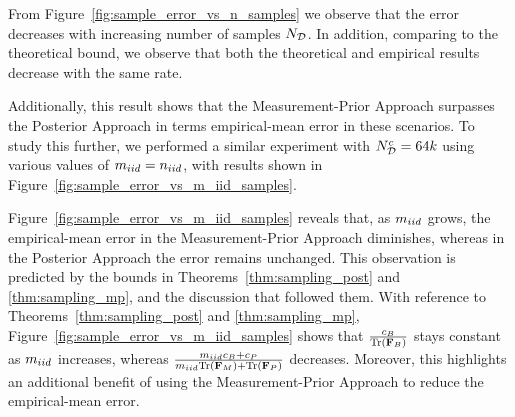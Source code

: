 From Figure~\ref{fig:sample_error_vs_n_samples} we observe that the error decreases with increasing number of samples $N_{\mathcal{D}}$. In addition, comparing to the theoretical bound, %
we observe that both the theoretical and empirical results decrease with the same rate. %
{Additionally, this result shows that the Measurement-Prior Approach surpasses the Posterior Approach  in terms empirical-mean error in these scenarios. 
To study this further, we performed a similar experiment with 
$N_{\mathcal{D}}^{{c}}=64k$ 
using various values of $m_{iid}=n_{iid}$, %
with results %
shown in Figure~\ref{fig:sample_error_vs_m_iid_samples}. 

Figure~\ref{fig:sample_error_vs_m_iid_samples} reveals that, as $m_{iid}$ grows, the empirical-mean error in the Measurement-Prior Approach diminishes, whereas in the Posterior Approach the error remains unchanged. This observation 
{is predicted by} the bounds in Theorems~\ref{thm:sampling_post} and \ref{thm:sampling_mp}, and the discussion that followed them. {With reference to Theorems~\ref{thm:sampling_post} and \ref{thm:sampling_mp}, Figure~\ref{fig:sample_error_vs_m_iid_samples} shows that $\frac{c_B}{\mathrm{Tr}\left(\mathbf{F}_{B}\right)}$ stays constant as $m_{iid}$ increases, whereas $\frac{m_{iid}c_B +c_P}{m_{iid}\mathrm{Tr}\left(\mathbf{F}_{M}\right)+\mathrm{Tr}\left(\mathbf{F}_{P}\right)}$ decreases.  } 
Moreover, this highlights an additional benefit of using the Measurement-Prior Approach to %
reduce the empirical-mean error.  


}
